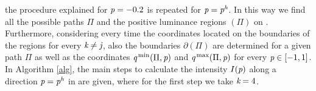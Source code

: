 the procedure explained for $\textit{p}=-0.2$ is repeated for $\textit{p}= \textit{p}^{\textit{h}}$.
In this way we find all the possible paths $\Pi$ and the positive luminance regions $(\Pi)$ on .
Furthermore, considering every time the coordinates located on the boundaries of the regions  for every $\textit{k}\neq\textit{j}$, also the boundaries $\partial$$(\Pi)$ are determined for a given path $\Pi$ as well as the coordinates $\textit{q}^\textrm{\,min}(\Pi,\textit{p})$ and $\textit{q}^\textrm{\,max}(\Pi,\textit{p})$ for every $\textit{p}\in [-1,1]$.
In Algorithm \ref{alg}, the main steps to calculate the intensity $I(\textit{p})$ along a direction
$\textit{p} = \textit{p}^{\textit{h}}$ in  are given, where for the first step we take $\textit{k}=4$.
